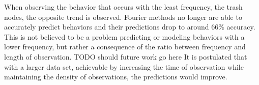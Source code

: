 \begin{table}[h!]
  \centering
  \caption{Hallway Meal Section 1}
\end{table}


When observing the behavior that occurs with the least frequency, the trash
nodes, the opposite trend is observed. Fourier methods no longer are able to
accurately predict behaviors and their predictions drop to around 66\% accuracy.
This is not believed to be a problem predicting or modeling behaviors with a
lower frequency, but rather a consequence of the ratio between frequency and
length of observation. TODO should future work go here\? It is postulated that
with a larger data set, achievable by increasing the time of observation while
maintaining the density of observations, the predictions would improve. \\

